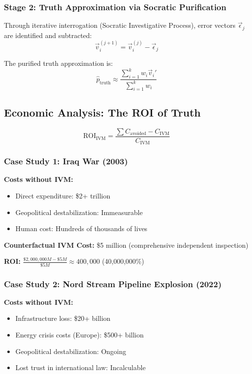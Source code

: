 \documentclass[11pt,a4paper]{article}
\theoremstyle{definition}
\theoremstyle{remark}
\begin{document}
\begin{small}
\subsubsection{Stage 2: Truth Approximation via Socratic Purification}

Through iterative interrogation (Socratic Investigative Process), error vectors $\vec{\epsilon}_j$ are identified and subtracted:
\begin{equation}
\vec{v}_i^{(j+1)} = \vec{v}_i^{(j)} - \vec{\epsilon}_j
\end{equation}

The purified truth approximation is:
\begin{equation}
\hat{p}_{\text{truth}} \approx \frac{\sum_{i=1}^{k} w_i \vec{v}_i'}{\sum_{i=1}^{k} w_i}
\end{equation}

\subsection{Economic Analysis: The ROI of Truth}

\begin{equation}
\text{ROI}_{\text{IVM}} = \frac{\sum C_{\text{avoided}} - C_{\text{IVM}}}{C_{\text{IVM}}}
\end{equation}

\subsubsection{Case Study 1: Iraq War (2003)}

\textbf{Costs without IVM:}
\begin{itemize}
\item Direct expenditure: \$2+ trillion
\item Geopolitical destabilization: Immeasurable
\item Human cost: Hundreds of thousands of lives
\end{itemize}

\textbf{Counterfactual IVM Cost:} \$5 million (comprehensive independent inspection)

\textbf{ROI:} $\frac{\$2,000,000M - \$5M}{\$5M} \approx 400,000$ (40,000,000\%)

\subsubsection{Case Study 2: Nord Stream Pipeline Explosion (2022)}

\textbf{Costs without IVM:}
\begin{itemize}
\item Infrastructure loss: \$20+ billion
\item Energy crisis costs (Europe): \$500+ billion
\item Geopolitical destabilization: Ongoing
\item Lost trust in international law: Incalculable
\end{itemize}


\end{small}
\end{document}
